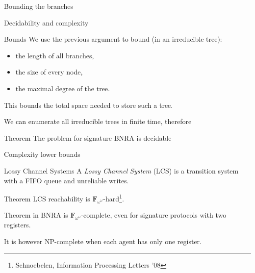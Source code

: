 \documentclass{beamer}
\begin{document}
\begin{frame}{Bounding the branches}
	\centering
	

\end{frame}


\begin{frame}{Decidability and complexity}
	\begin{block}{Bounds}
	We use the previous argument to bound (in an irreducible tree):
	\begin{itemize}
	\item the length of all branches,
	\item the size of every node,
	\item the maximal degree of the tree.
	\end{itemize}
	This bounds the total space needed to store such a tree.
	\end{block}
	\pause 

	We can enumerate all irreducible trees in finite time, therefore
	
	\begin{block}{Theorem}
		The {} problem for \color{blue}signature \color{black} BNRA is decidable \onslide<3->{\color{red!70!black} and in $\mathbf{F}_{\omega^\omega}$.}
	\end{block} 
\end{frame}

\begin{frame}{Complexity lower bounds}
	\begin{block}{Lossy Channel Systems}
	A \emph{Lossy Channel System} (LCS) is a transition system with a FIFO queue and unreliable writes.
	\end{block}

	\begin{block}{Theorem}
	LCS reachability is $\mathbf{F}_{\omega^\omega}$-hard\footnote{Schnoebelen, Information Processing Letters '08}.
	\end{block}

	\pause 

	\begin{block}{Theorem}
	{} in BNRA is $\mathbf{F}_{\omega^\omega}$-complete, even for signature protocols with two registers.
	\end{block}

	\pause
	It is however NP-complete when each agent has only one register.
\end{frame}
\end{document}
